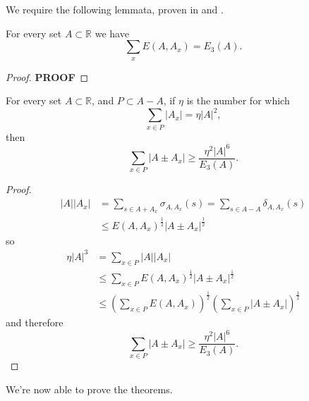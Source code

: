 \documentclass[12pt,reqno]{amsart}
\begin{document}
We require the following lemmata, proven in \cite{Schoen-lemma} and \cite{shkredov}.
\begin{lemma}
For every set \(A \subset \mathbb{R} \) we have
\[
    \sum _{x} E\left( A, A_{x}  \right) = E_{3} (A)
.\]
\end{lemma}

\begin{proof}
\textbf{PROOF}
\end{proof}

\begin{lemma}\label{lem:shkredov-main-lem}
For every set \(A \subset \mathbb{R} \), and \(P \subset A - A\), if \(\eta\) is the number for which
\[
    \sum _{x \in P} \left\lvert A_{x}  \right\rvert = \eta \left\lvert A \right\rvert ^{2}
,\]
then
\[
    \sum _{x \in P} \left\lvert A \pm A_{x}  \right\rvert \geq \frac{\eta ^{2} \left\lvert A \right\rvert ^{6}}{E_{3} (A)} 
.\]
\end{lemma}

\begin{proof}
\begin{align*}
\left\lvert A \right\rvert \left\lvert A_{x}  \right\rvert & = \sum _{s \in A + A_{x} } \sigma_{A, A_{x} } (s) = \sum _{s \in A-A} \delta_{A, A_{x} } (s)\\
& \leq E\left( A, A_{x}  \right) ^{\frac{1}{2} } \left\lvert A \pm  A_{x}  \right\rvert ^{\frac{1}{2} }
\end{align*}
so
\begin{align*}
\eta \left\lvert A \right\rvert ^{3} & =  \sum _{x \in P} \left\lvert A \right\rvert \left\lvert A_{x}  \right\rvert \\
& \leq \sum _{x \in P} E(A, A_{x} )^{\frac{1}{2} }\left\lvert A \pm A_{x}  \right\rvert ^{\frac{1}{2} } \\
& \leq \left( \sum _{x\in P} E(A,A_{x} ) \right)  ^{\frac{1}{2} } \left( \sum _{x \in P} \left\lvert A \pm A_{x}  \right\rvert  \right) ^{\frac{1}{2} }
\end{align*}
and therefore
\[
    \sum _{x \in P} \left\lvert A \pm A_{x}  \right\rvert \geq \frac{\eta ^{2}\left\lvert A \right\rvert ^{6}}{E_{3} (A)} 
.\]

\end{proof}

We're now able to prove the theorems.
\end{document}
